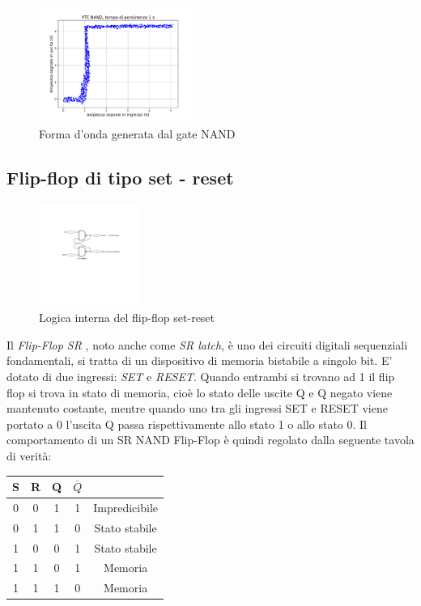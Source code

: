 \documentclass[journal]{IEEEtran}
\begin{document}
\begin{figure}[H]%
\begin{center}
\includegraphics[width=0.45\textwidth]{analysis/output/NAND-XY.pdf}
\caption{Forma d'onda generata dal gate NAND}
\label{fig:graph_ring_oscillator}
\end{center}
\end{figure}


\subsection{Flip-flop di tipo set - reset}
\begin{figure}[H]%
\begin{center}
\includegraphics[width=0.30\textwidth]{sch-simulations/digital/output/flip-flop-RS.pdf}
\caption{Logica interna del flip-flop set-reset}
\label{fig:circuit_flip_flop}
\end{center}
\end{figure}
Il \textit{Flip-Flop SR }, noto  anche come \textit{SR latch}, è uno dei circuiti digitali sequenziali fondamentali, si tratta di un dispositivo di memoria bistabile a singolo bit. E' dotato di due ingressi: \textit{SET} e \textit{RESET}. Quando entrambi si trovano ad 1 il flip flop si trova in stato di memoria, cioè lo stato delle uscite Q e Q negato viene mantenuto costante, mentre quando uno tra gli ingressi SET e RESET viene portato a 0 l'uscita Q passa rispettivamente allo stato 1 o allo stato 0.
Il comportamento di un SR NAND Flip-Flop è quindi regolato dalla seguente tavola di verità:
\begin{center}
\begin{tabular}{ |c|c|c|c|c| } 
 \hline
 \rowcolor{lightgray}
S & R & Q & $\overline{Q}$ &\\ \hline \hline
 0 & 0 & 1 & 1 & Impredicibile\\  \hline
 0 & 1 & 1 & 0 & Stato stabile\\ \hline
 1 & 0 & 0 & 1 & Stato stabile\\ \hline
 1 & 1 & 0 & 1 & Memoria\\ \hline
 1 & 1 & 1 & 0 & Memoria\\ \hline
 
 \hline
\end{tabular}
\end{center}
\end{document}
